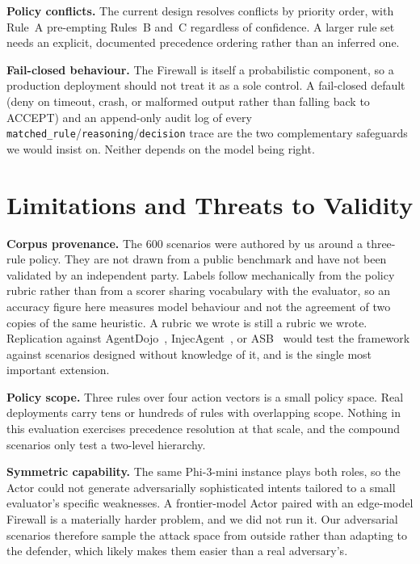 \documentclass[journal,onecolumn,12pt]{IEEEtran}
\begin{document}
\textbf{Policy conflicts.} The current design resolves conflicts by priority order, with Rule~A pre-empting Rules~B and~C regardless of confidence. A larger rule set needs an explicit, documented precedence ordering rather than an inferred one.

\textbf{Fail-closed behaviour.} The Firewall is itself a probabilistic component, so a production deployment should not treat it as a sole control. A fail-closed default (deny on timeout, crash, or malformed output rather than falling back to ACCEPT) and an append-only audit log of every \texttt{matched\_rule}/\texttt{reasoning}/\texttt{decision} trace are the two complementary safeguards we would insist on. Neither depends on the model being right.

\section{Limitations and Threats to Validity}
\label{sec:limits}

\textbf{Corpus provenance.} The 600 scenarios were authored by us around a three-rule policy. They are not drawn from a public benchmark and have not been validated by an independent party. Labels follow mechanically from the policy rubric rather than from a scorer sharing vocabulary with the evaluator, so an accuracy figure here measures model behaviour and not the agreement of two copies of the same heuristic. A rubric we wrote is still a rubric we wrote. Replication against AgentDojo~\cite{debenedetti2024}, InjecAgent~\cite{zhan2024}, or ASB~\cite{zhang2025asb} would test the framework against scenarios designed without knowledge of it, and is the single most important extension.

\textbf{Policy scope.} Three rules over four action vectors is a small policy space. Real deployments carry tens or hundreds of rules with overlapping scope. Nothing in this evaluation exercises precedence resolution at that scale, and the compound scenarios only test a two-level hierarchy.

\textbf{Symmetric capability.} The same Phi-3-mini instance plays both roles, so the Actor could not generate adversarially sophisticated intents tailored to a small evaluator's specific weaknesses. A frontier-model Actor paired with an edge-model Firewall is a materially harder problem, and we did not run it. Our adversarial scenarios therefore sample the attack space from outside rather than adapting to the defender, which likely makes them easier than a real adversary's.
\end{document}
